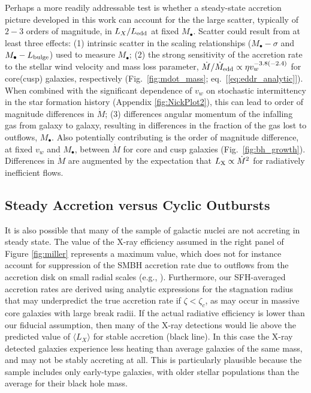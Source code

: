 \documentclass[usenatbib,fleqn]{mn2e}
\newcommand{\Mbh}[1][]{M_{\bullet#1}}
\begin{document}
  Perhaps a more readily addressable test is whether a steady-state
  accretion picture developed in this work can account for the the
  large scatter, typically of $2-3$ orders of magnitude, in
  $L_{X}/L_{\rm edd}$ at fixed $M_{\bullet}$.  Scatter could result
  from at least three effects: (1) intrinsic scatter in the scaling
  relationships ($\Mbh-\sigma$ and $\Mbh-L_{\rm bulge}$) used to
  measure $\Mbh$; (2) the strong sensitivity of the accretion rate to
  the stellar wind velocity and mass loss parameter,
  $\dot{M}/\dot{M}_{\rm edd} \propto \eta v_{w}^{-3.8(-2.4)}$ for
  core(cusp) galaxies, respectively (Fig.~\ref{fig:mdot_mass};
  eq.~[\ref{eq:eddr_analytic}]).  When combined with the significant
  dependence of $v_w$ on stochastic intermittency in the star
  formation history (Appendix \ref{fig:NickPlot2}), this can lead to
  order of magnitude differences in $\dot{M}$; (3) differences angular
  momentum of the infalling gas from galaxy to galaxy, resulting in
  differences in the fraction of the gas lost to outflows, $\Mbh$.
  Also potentially contributing is the order of magnitude difference,
  at fixed $v_w$ and $M_{\bullet}$, between $\dot{M}$ for core and
  cusp galaxies (Fig.~\ref{fig:bh_growth}).  Differences in $\dot{M}$
  are augmented by the expectation that $L_{\rm X} \propto \dot{M}^{2}
  $ for radiatively inefficient flows.





\subsection{Steady Accretion versus Cyclic Outbursts}
\label{sec:cycle}

It is also possible that many of the \citet{Miller+15} sample of
galactic nuclei are not accreting in steady state.  The value of the
X-ray efficiency assumed in the right panel of Figure \ref{fig:miller}
represents a maximum value, which does not for instance account for suppression
of the SMBH accretion rate due to outflows from the accretion disk on
small radial scales (e.g., \citealt{Blandford&Begelman99}).  Furthermore, our SFH-averaged accretion rates are derived using analytic expressions for the stagnation radius that may underpredict the true accretion rate if $\zeta < \zeta_c$, as may occur in massive core galaxies with large break radii.  If the actual radiative efficiency is lower than our fiducial assumption,
then many of the X-ray detections would lie above the predicted value
of $\langle L_X \rangle$ for stable accretion (black line).  In this
case the X-ray detected galaxies experience less heating than
average galaxies of the same mass, and may not be stably accreting at
all.  This is particularly plausible because the \citet{Miller+15} sample includes only early-type galaxies, with older stellar
populations than the average for their black hole mass.
\end{document}
